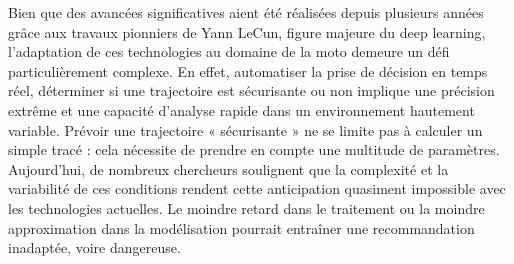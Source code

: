 Bien que des avancées significatives aient été réalisées depuis plusieurs années grâce aux travaux pionniers de Yann LeCun, figure majeure du deep learning, l’adaptation de ces technologies au domaine de la moto demeure un défi particulièrement complexe. En effet, automatiser la prise de décision en temps réel, déterminer si une trajectoire est sécurisante ou non implique une précision extrême et une capacité d’analyse rapide dans un environnement hautement variable.
Prévoir une trajectoire « sécurisante » ne se limite pas à calculer un simple tracé : cela nécessite de prendre en compte une multitude de paramètres.
Aujourd’hui, de nombreux chercheurs soulignent que la complexité et la variabilité de ces conditions rendent cette anticipation quasiment impossible avec les technologies actuelles. Le moindre retard dans le traitement ou la moindre approximation dans la modélisation pourrait entraîner une recommandation inadaptée, voire dangereuse.
\vspace{0.5cm}

